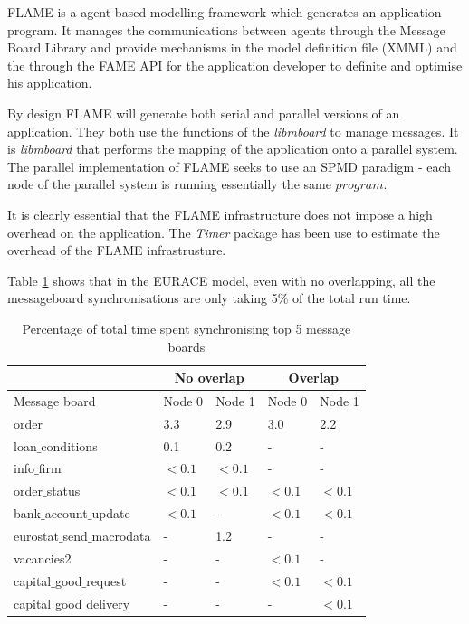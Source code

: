 FLAME is a agent-based modelling framework which generates an application program. It manages the communications between agents through the Message Board Library and provide mechanisms in the model definition file (XMML) and the through the FAME API for the application developer to definite and optimise his application.

By design FLAME will generate both serial and parallel versions of an application. They both use the functions of the \textit{libmboard} to manage messages. It is \textit{libmboard} that performs the mapping of the application onto a parallel system. The parallel implementation of FLAME seeks to use an SPMD paradigm - each node of the parallel system is running essentially the same $program$. 

It is clearly essential that the FLAME infrastructure does not impose a high overhead on the application. The \textit{Timer} package has been use to estimate the overhead of the FLAME infrastrusture. 

Table \ref{table:overlap} shows that in the EURACE model, even with no overlapping, all the messageboard synchronisations are only taking 5\% of the total run time.

\begin{table}[ht]
\centering
\begin{tabular}{|l|l|l|l|l|}\hline
              & \multicolumn{2}{c|}{No overlap} & \multicolumn{2}{c|}{Overlap} \\ \hline
Message board & Node 0 & Node 1 & Node 0 & Node 1 \\ \hline \hline
order & 3.3 & 2.9 & 3.0 & 2.2 \\ \hline
loan$\_$conditions & 0.1 & 0.2 & - & - \\ \hline
info$\_$firm & $<0.1$ & $<0.1$ & - & -  \\ \hline
order$\_$status & $<0.1$ & $<0.1$ & $<0.1$ & $<0.1$ \\ \hline
bank$\_$account$\_$update & $<0.1$ & - & $<0.1$ & $<0.1$ \\ \hline
eurostat$\_$send$\_$macrodata & - & 1.2 & - & -  \\ \hline
vacancies2 & - & - & $<0.1$ & -  \\ \hline
capital$\_$good$\_$request & - & - & $<0.1$ & $<0.1$ \\ \hline
capital$\_$good$\_$delivery & - & - & - & $<0.1$ \\ \hline 
\end{tabular}
\caption{Percentage of total time spent synchronising top 5 message boards}
\label{table:overlap}
\end{table}

